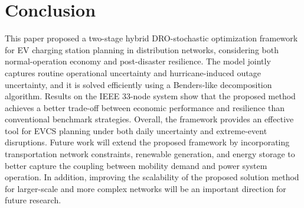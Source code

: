 \documentclass[journal]{IEEEtran}
\providecommand{\1}{\mathbf{1}}
\begin{document}
\section{Conclusion}
This paper proposed a two-stage hybrid DRO-stochastic optimization framework for EV charging station planning in distribution networks, considering both normal-operation economy and post-disaster resilience. The model jointly captures routine operational uncertainty and hurricane-induced outage uncertainty, and it is solved efficiently using a Benders-like decomposition algorithm. Results on the IEEE 33-node system show that the proposed method achieves a better trade-off between economic performance and resilience than conventional benchmark strategies. Overall, the framework provides an effective tool for EVCS planning under both daily uncertainty and extreme-event disruptions.
Future work will extend the proposed framework by incorporating transportation network constraints, renewable generation, and energy storage to better capture the coupling between mobility demand and power system operation. In addition, improving the scalability of the proposed solution method for larger-scale and more complex networks will be an important direction for future research.




\appendix


\ifCLASSOPTIONcaptionsoff
  \newpage
\fi
\end{document}
